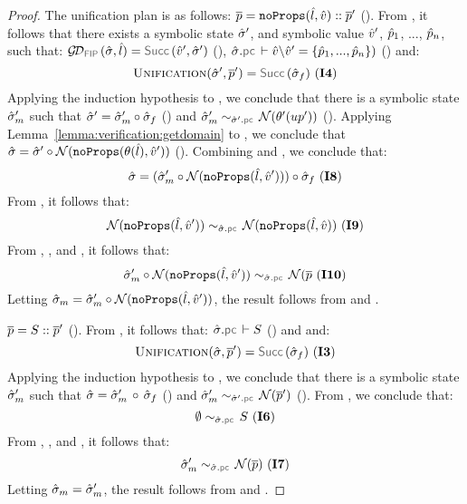 \begin{proof}
\noindent {} The unification plan is as follows: 
$\overline{p} = \texttt{noProps}(\hat{l}, \hat{v}) :: \overline{p}'$ (). 
From , it follows that there exists a symbolic state $\hat{\sigma}'$,
and symbolic value $\hat{v}'$, $\hat{p}_1$, ..., $\hat{p}_n$, such that: 
$\GetDomainV{\sstate, \sloc} = \success{\sexprv', \sstate'}$ (), 
$
\sstate.\pcsel \vdash \sexprv \backslash \sexprv' = \{ \sexprp_1, ..., \sexprp_n \})
$ () and: 
$$
\unificationfunction(\sstate', \jvec{\spass}') = \success{\sstate_f} \text{ (\ieq{4})}
$$
Applying the induction hypothesis to , we conclude that there is a symbolic state 
$\hat{\sigma}_m'$ such that  $\hat{\sigma}' = \hat{\sigma}_m' \circ \hat{\sigma}_f$ () and
$\stateequivrel{\sstate_m'}{\normaliser(\subst'(\up'))}{\sstate'.\pcsel}$ (). 
%
Applying Lemma~\ref{lemma:verification:getdomain} to , we conclude that 
$\hat{\sigma} = \hat{\sigma}' \circ \mathcal{N}(\texttt{noProps}(\theta(\hat{l}), \hat{v}'))$ (). 
%
Combining  and , we conclude that: 
$$
\hat{\sigma} = (\hat{\sigma}_m' \circ \mathcal{N}(\texttt{noProps}(\hat{l}, \hat{v}'))) \circ \hat{\sigma}_f  \text{ ({\bf I8})}
$$
From  , it follows that: 
$$
\stateequivrel{\normaliser(\emptyfields{\sloc}{\sexprv'})}{\normaliser(\emptyfields{\sloc}{\sexprv})}{\sstate.\pcsel} \text{ (\ieq{9})}
$$
From , , and , it follows that: 
$$
\stateequivrel{\sstate_m' \statecompose \normaliser(\emptyfields{\sloc}{\sexprv'})}{\normaliser(\jvec{\spass}}{\sstate.\pcsel} \text{ (\ieq{10})}
$$
Letting $\hat{\sigma}_m = \hat{\sigma}_m' \circ \mathcal{N}(\texttt{noProps}(\hat{l}, \hat{v}'))$, the result follows 
from  and . 
\vspace{5pt}


\noindent {}
$\overline{p} = S :: \overline{p}'$ (). 
From , it follows that: 
$\sstate.\pcsel \vdash \sass$ () and 
and:
$$
\unificationfunction(\sstate, \jvec{\spass}') = \success{\sstate_f} \text{ (\ieq{3})}
$$
%
Applying the induction hypothesis to , we conclude that there is a symbolic state 
$\hat{\sigma}_m'$ such that  $\hat{\sigma} = \hat{\sigma}_m' \, \circ  \, \hat{\sigma}_f$ () and
$\stateequivrel{\sstate_m'}{\normaliser(\jvec{\spass}')}{\sstate'.\pcsel}$ (). 
From , we conclude that: 
$$
\stateequivrel{\emptystate}{\sass}{\sstate.\pcsel} \text{ (\ieq{6})}
$$
From , , and , it follows that: 
$$
\stateequivrel{\sstate_m'}{\normaliser(\jvec{\spass})}{\sstate.\pcsel} \text{ (\ieq{7})}
$$
Letting $\hat{\sigma}_m = \hat{\sigma}_m'$, the result follows 
from  and .
\end{proof}
 
%


